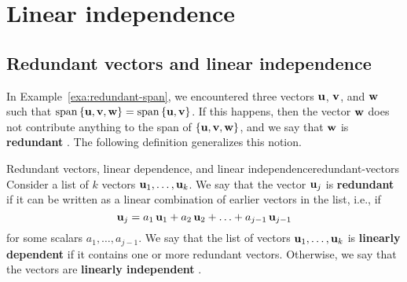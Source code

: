 \section{Linear independence}

\subsection{Redundant vectors and linear independence}

In Example~\ref{exa:redundant-span}, we encountered three vectors
$\mbox{\bf u}$, $\mbox{\bf v}$, and $\mbox{\bf w}$ such that
$\sspan\set{\vect{u},\vect{v},\vect{w}} =
\sspan\set{\vect{u},\vect{v}}$.  If this happens, then the vector
$\mbox{\bf w}$ does not contribute anything to the span of
$\left\{\mbox{\bf u},\mbox{\bf v},\mbox{\bf w}\right\}$, and we say that $\mbox{\bf w}$ is
\textbf{redundant}%
. The following
definition generalizes this notion.

\begin{definition}{Redundant vectors, linear dependence, and linear independence}{redundant-vectors}
  Consider a list of $k$ vectors $\mbox{\bf u}_1,\ldots,\mbox{\bf u}_k$.  We
  say that the vector $\mbox{\bf u}_j$ is \textbf{redundant}%
   if it can be
  written as a linear combination of earlier vectors in the list,
  i.e., if
  \begin{equation*}
    \mbox{\bf u}_j = a_1\,\mbox{\bf u}_1 + a_2\,\mbox{\bf u}_2 + \ldots + a_{j-1}\,\mbox{\bf u}_{j-1}
  \end{equation*}
  for some scalars $a_1,\ldots,a_{j-1}$. We say that the list of
  vectors $\mbox{\bf u}_1,\ldots,\mbox{\bf u}_k$ is \textbf{linearly
    dependent}%
   if it
  contains one or more redundant vectors. Otherwise, we say that the
  vectors are \textbf{linearly independent}%
  .  
\end{definition}

